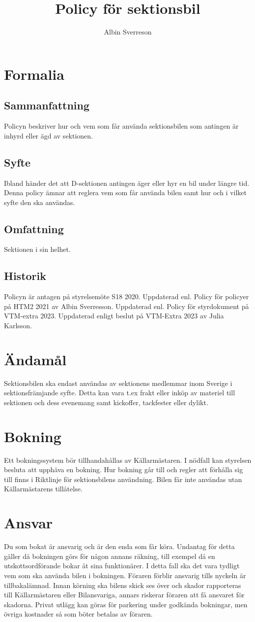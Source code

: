 \documentclass{dsekprotokoll}
\author{Albin Sverreson}
\title{Policy för sektionsbil}
\begin{document}
\maketitle
\section{Formalia}
\subsection{Sammanfattning}
Policyn beskriver hur och vem som får använda sektionsbilen som
antingen är inhyrd eller ägd av sektionen.
\subsection{Syfte}
Ibland händer det att D-sektionen antingen äger eller hyr en bil
under längre tid. Denna policy ämnar att reglera vem som får använda
bilen samt hur och i vilket syfte den ska användas.
\subsection{Omfattning}
Sektionen i sin helhet.
\subsection{Historik}
Policyn är antagen på styrelsemöte S18 2020.
Uppdaterad enl. Policy för policyer på HTM2 2021 av Albin Sverresson.
Uppdaterad enl. Policy för styrdokument på VTM-extra 2023.
Uppdaterad enligt beslut på VTM-Extra 2023 av Julia Karlsson.

\section{Ändamål}
Sektionsbilen ska endast användas av sektionens medlemmar inom
Sverige i sektionsfrämjande syfte. Detta kan vara t.ex frakt eller
inköp av materiel till sektionen och dess evenemang samt kickoffer,
tackfester eller dylikt.
\section{Bokning}
Ett bokningssystem bör tillhandahållas av Källarmästaren. I nödfall
kan styrelsen besluta att upphäva en bokning. Hur bokning går till
och regler att förhålla sig till finns i Riktlinje för sektionsbilens
användning. Bilen får inte användas utan Källarmästarens tillåtelse.

\section{Ansvar}
Du som bokat är ansvarig och är den enda som får köra. Undantag för
detta gäller då bokningen görs för någon annans räkning, till exempel
då en utskottsordförande bokar åt sina funktionärer. I detta fall ska
det vara tydligt vem som ska använda bilen i bokningen. Föraren
förblir ansvarig tills nyckeln är tillbakalämnad. Innan körning ska
bilens skick ses över och skador rapporteras till Källarmästaren eller
Bilansvariga, annars riskerar föraren att få ansvaret för skadorna.
Privat utlägg kan göras för parkering under godkända
bokningar, men övriga kostnader så som böter betalas av föraren.
\end{document}
